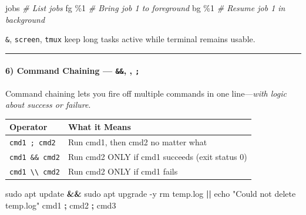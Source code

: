 \documentclass[
  english,
  paper=a4,
  oneside  ,captions=tableheading
]{scrartcl}
\newenvironment{Shaded}{}{}
\newcommand{\AttributeTok}[1]{\textcolor[rgb]{0.49,0.56,0.16}{#1}}
\newcommand{\BuiltInTok}[1]{\textcolor[rgb]{0.00,0.50,0.00}{#1}}
\newcommand{\CommentTok}[1]{\textcolor[rgb]{0.38,0.63,0.69}{\textit{#1}}}
\newcommand{\ExtensionTok}[1]{#1}
\newcommand{\FunctionTok}[1]{\textcolor[rgb]{0.02,0.16,0.49}{#1}}
\newcommand{\KeywordTok}[1]{\textcolor[rgb]{0.00,0.44,0.13}{\textbf{#1}}}
\newcommand{\NormalTok}[1]{#1}
\newcommand{\StringTok}[1]{\textcolor[rgb]{0.25,0.44,0.63}{#1}}
\newcounter{none} %
\begin{document}
\begin{Shaded}
\begin{Highlighting}[]
\BuiltInTok{jobs}                      \CommentTok{\# List jobs}
\BuiltInTok{fg}\NormalTok{ \%1                     }\CommentTok{\# Bring job 1 to foreground}
\BuiltInTok{bg}\NormalTok{ \%1                     }\CommentTok{\# Resume job 1 in background}
\end{Highlighting}
\end{Shaded}

\texttt{\&}, \texttt{screen}, \texttt{tmux} keep long tasks active while
terminal remains usable.

\begin{center}\rule{0.5\linewidth}{0.5pt}\end{center}

\paragraph{\texorpdfstring{6) Command Chaining --- \texttt{\&\&},
\texttt{\textbar{}\textbar{}},
\texttt{;}}{6) Command Chaining --- \&\&, \textbar\textbar, ;}}\label{command-chaining}

Command chaining lets you fire off multiple commands in one
line---\emph{with logic about success or failure}.

{\def\LTcaptype{none} %
\begin{longtable}[]{@{}ll@{}}
\toprule\noalign{}
Operator & What it Means \\
\midrule\noalign{}
\endhead
\bottomrule\noalign{}
\endlastfoot
\texttt{cmd1\ ;\ cmd2} & Run cmd1, then cmd2 no matter what \\
\texttt{cmd1\ \&\&\ cmd2} & Run cmd2 ONLY if cmd1 succeeds (exit status
0) \\
\texttt{cmd1\ \textbackslash{}\textbar{}\textbackslash{}\textbar{}\ cmd2}
& Run cmd2 ONLY if cmd1 fails \\
\end{longtable}
}

\begin{Shaded}
\begin{Highlighting}[]
\FunctionTok{sudo}\NormalTok{ apt update }\KeywordTok{\&\&} \FunctionTok{sudo}\NormalTok{ apt upgrade }\AttributeTok{{-}y}
\FunctionTok{rm}\NormalTok{ temp.log }\KeywordTok{||} \BuiltInTok{echo} \StringTok{"Could not delete temp.log"}
\ExtensionTok{cmd1} \KeywordTok{;} \ExtensionTok{cmd2} \KeywordTok{;} \ExtensionTok{cmd3}
\end{Highlighting}
\end{Shaded}
\end{document}
